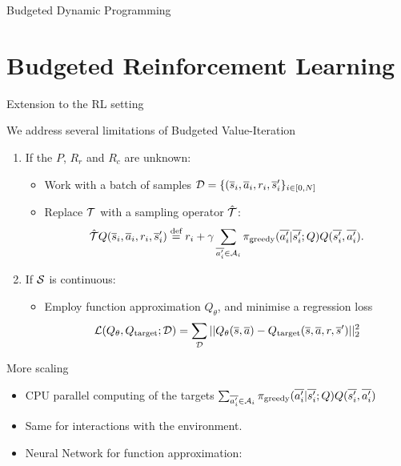 \documentclass[slideopt,A4,showboxes,svgnames]{beamer}
\begin{document}
\begin{frame}{Budgeted Dynamic Programming}
\begin{center}
\end{center}
\end{frame}

\section{Budgeted Reinforcement Learning}
\frame{\sectionpage}

\begin{frame}{Extension to the RL setting}

We address several limitations of Budgeted Value-Iteration

\begin{enumerate}[<+->]
	\item If the $P$, $R_r$ and $R_c$ are unknown:
	\begin{itemize}[<+->]
		\item Work with a {batch} of samples $\mathcal{D}=\{(\overline{s}_i,\overline{a}_i,r_i,\overline{s}_i'\}_{i\in [0,N]}$
		\item Replace $\mathcal{T}$ with a sampling operator $\hat{\mathcal{T}}$:
		\begin{equation*}
		\hat{\cT} Q(\os_i, \oa_i, r_i, \os'_i) \eqdef r_i + \gamma \sum_{\ov{a'_i}\in \cA_i} \pi_\text{greedy}(\ov{a'_i}|\ov{s'_i}; Q) Q(\ov{s'_i}, \ov{a'_i}).
		\end{equation*}
	\end{itemize}
	\item If $\mathcal{S}$ is continuous:
	\begin{itemize}
		\item Employ function approximation $Q_\theta$, and minimise a regression loss
		$$\mathcal{L}(Q_\theta, Q_\text{target};\mathcal{D}) = \sum_{\mathcal{D}} ||Q_\theta(\overline{s}, \overline{a}) - Q_\text{target}(\overline{s}, \overline{a}, r, \overline{s}')||_2^2$$
	\end{itemize}
	
\end{enumerate}

\end{frame}

\begin{frame}{More scaling}

\begin{itemize}[<+->]
\item CPU parallel computing of the targets $\sum_{\overline{a'_i}\in \mathcal{A}_i} \pi_\text{greedy}(\overline{a'_i}|\overline{s'_i}; Q) Q(\overline{s'_i}, \overline{a'_i})$
\item Same for interactions with the environment.
\item Neural Network for function approximation: 
\begin{center}
	\resizebox{.5\textwidth}{!}{%
		
	}
\end{center}
\end{itemize}
\end{frame}
\end{document}
